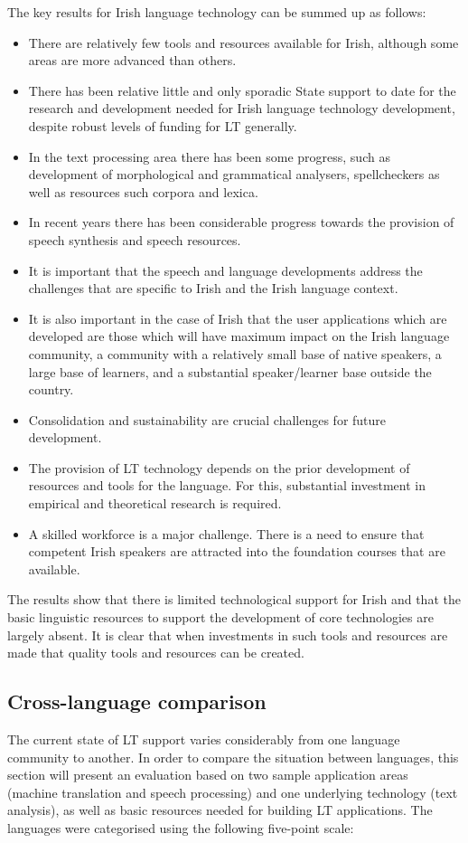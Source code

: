 \begin{multicols}{2}
The key results for Irish language technology can be summed up as follows:

\begin{itemize}
\item There are relatively few tools and resources available for Irish, although some areas are more advanced than others. 
\item There has been relative little and only sporadic State support to date for the research and development needed for Irish language technology development, despite robust levels of funding for LT generally.
\item In the text processing area there has been some progress, such as development of morphological and grammatical analysers, spellcheckers as well as resources such corpora and lexica.
\item In recent years there has been considerable progress towards the provision of speech synthesis and speech resources. 
\item It is important that the speech and language developments address  the challenges that are specific to Irish and the Irish language context. 
\item It is also important in the case of Irish that the user applications which are developed are those which will have maximum impact on the Irish language community, a community with a relatively small base of native speakers, a large base of learners, and a substantial speaker/learner base outside the country. 
\item Consolidation and sustainability are crucial challenges for future development. 
\item The provision of LT technology depends on the prior development of resources and tools for the language. For this, substantial investment in empirical and theoretical research is required.
\item A skilled workforce is a major challenge. There is a need to ensure that competent Irish speakers are attracted into the foundation courses that are available.

\end{itemize}

The results show that there is limited technological support for Irish and that the basic linguistic resources to support the development of core technologies are largely absent. It is clear that when investments in such tools and resources are made that quality tools and resources can be created.

\subsection{Cross-language comparison}
The current state of LT support varies considerably from one language community to another. In order to compare the situation between languages, this section will present an evaluation based on two sample application areas (machine translation and speech processing) and one underlying technology (text analysis), as well as basic resources needed for building LT applications. The languages were categorised using the following five-point scale: 


\end{multicols}

